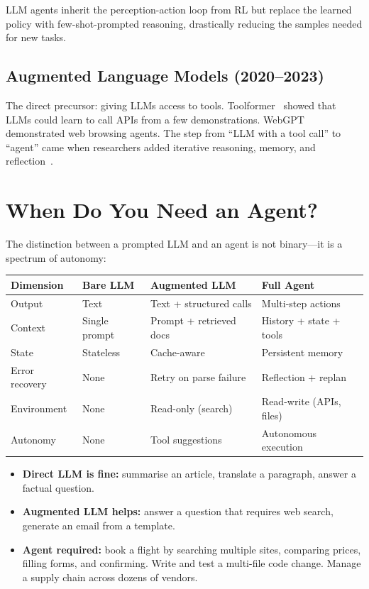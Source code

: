 LLM agents inherit the perception-action loop from RL but replace the learned policy with few-shot-prompted reasoning, drastically reducing the samples needed for new tasks.

\subsection{Augmented Language Models (2020--2023)}

The direct precursor: giving LLMs access to tools. Toolformer~\cite{schick2023toolformer} showed that LLMs could learn to call APIs from a few demonstrations. WebGPT~\cite{nakano2021webgpt} demonstrated web browsing agents. The step from ``LLM with a tool call'' to ``agent'' came when researchers added iterative reasoning, memory, and reflection~\cite{yao2023react}.

\section{When Do You Need an Agent?}

The distinction between a prompted LLM and an agent is not binary---it is a spectrum of autonomy:

\begin{longtable}{p{3cm}p{4cm}p{4cm}p{4cm}}
	\toprule
	\textbf{Dimension} & \textbf{Bare LLM} & \textbf{Augmented LLM}  & \textbf{Full Agent}      \\
	\midrule
	Output             & Text              & Text + structured calls & Multi-step actions       \\
	Context            & Single prompt     & Prompt + retrieved docs & History + state + tools  \\
	State              & Stateless         & Cache-aware             & Persistent memory        \\
	Error recovery     & None              & Retry on parse failure  & Reflection + replan      \\
	Environment        & None              & Read-only (search)      & Read-write (APIs, files) \\
	Autonomy           & None              & Tool suggestions        & Autonomous execution     \\
	\bottomrule
\end{longtable}

\begin{example}
	\begin{itemize}
		\item \textbf{Direct LLM is fine:} summarise an article, translate a paragraph, answer a factual question.
		\item \textbf{Augmented LLM helps:} answer a question that requires web search, generate an email from a template.
		\item \textbf{Agent required:} book a flight by searching multiple sites, comparing prices, filling forms, and confirming. Write and test a multi-file code change. Manage a supply chain across dozens of vendors.
	\end{itemize}
\end{example}

